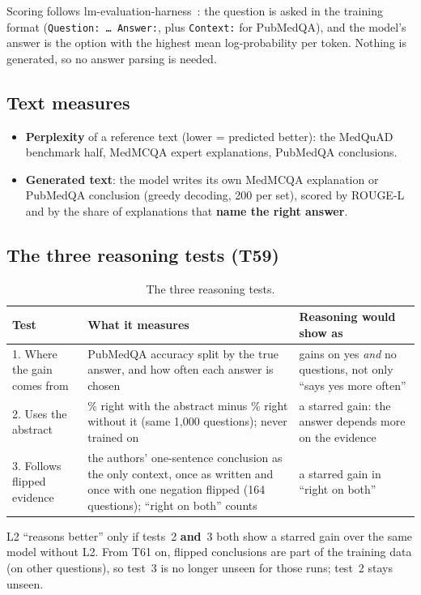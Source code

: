 \documentclass[a4paper,11pt,parskip=half]{scrartcl}
\newcommand{\code}[1]{\texttt{\small #1}}
\begin{document}
Scoring follows lm-evaluation-harness~\cite{lmeval}: the question is asked in the training format (\code{Question: \dots{} Answer:}, plus \code{Context:} for PubMedQA), and the model's answer is the option with the highest mean log-probability per token. Nothing is generated, so no answer parsing is needed.

\subsection{Text measures}
\begin{itemize}
  \item \textbf{Perplexity} of a reference text (lower = predicted better): the MedQuAD benchmark half, MedMCQA expert explanations, PubMedQA conclusions.
  \item \textbf{Generated text}: the model writes its own MedMCQA explanation or PubMedQA conclusion (greedy decoding, 200 per set), scored by ROUGE-L~\cite{rouge} and by the share of explanations that \textbf{name the right answer}.
\end{itemize}

\subsection{The three reasoning tests (T59)}

\begin{table}[H]
\centering\small
\begin{tabularx}{\linewidth}{@{}p{3.2cm}YY@{}}
\toprule
Test & What it measures & Reasoning would show as\\
. Where the gain comes from & PubMedQA accuracy split by the true answer, and how often each answer is chosen & gains on yes \emph{and} no questions, not only ``says yes more often''\\
2. Uses the abstract & \% right with the abstract minus \% right without it (same 1{,}000 questions); never trained on & a starred gain: the answer depends more on the evidence\\
3. Follows flipped evidence & the authors' one-sentence conclusion as the only context, once as written and once with one negation flipped (164 questions); ``right on both'' counts & a starred gain in ``right on both''\\
\bottomrule
\end{tabularx}
\caption{The three reasoning tests.}
\end{table}

\begin{rulebox}[title={Decision rule, fixed before the runs}]
L2 ``reasons better'' only if tests~2 \textbf{and}~3 both show a starred gain over the same model without L2. From T61 on, flipped conclusions are part of the training data (on other questions), so test~3 is no longer unseen for those runs; test~2 stays unseen.
\end{rulebox}
\end{document}
